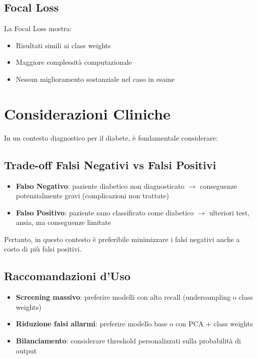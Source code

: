 \subsection{Focal Loss}

La Focal Loss mostra:
\begin{itemize}
    \item Risultati simili ai class weights
    \item Maggiore complessità computazionale
    \item Nessun miglioramento sostanziale nel caso in esame
\end{itemize}

\section{Considerazioni Cliniche}

In un contesto diagnostico per il diabete, è fondamentale considerare:

\subsection{Trade-off Falsi Negativi vs Falsi Positivi}

\begin{itemize}
    \item \textbf{Falso Negativo}: paziente diabetico non diagnosticato $\rightarrow$ conseguenze potenzialmente gravi (complicazioni non trattate)
    \item \textbf{Falso Positivo}: paziente sano classificato come diabetico $\rightarrow$ ulteriori test, ansia, ma conseguenze limitate
\end{itemize}

Pertanto, in questo contesto è preferibile minimizzare i falsi negativi anche a costo di più falsi positivi.

\subsection{Raccomandazioni d'Uso}

\begin{itemize}
    \item \textbf{Screening massivo}: preferire modelli con alto recall (undersampling o class weights)
    \item \textbf{Riduzione falsi allarmi}: preferire modello base o con PCA + class weights
    \item \textbf{Bilanciamento}: considerare threshold personalizzati sulla probabilità di output
\end{itemize}

